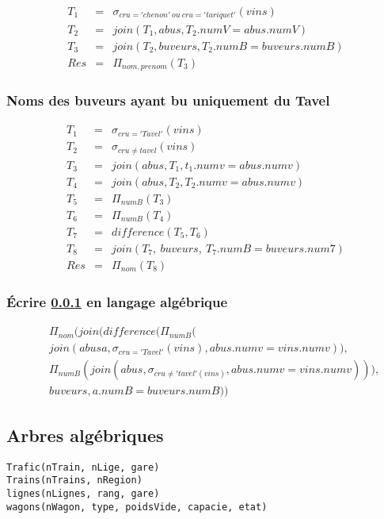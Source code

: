 \begin{eqnarray*}
	T_1 &=&  \sigma_{cru='chenon'\ ou\ cru='tariquet'}(vins)\\
	T_2&=&   join(T_1, abus, T_2.numV= abus.numV)\\
	T_3 &=& join(T_2, buveurs, T_2.numB=buveurs.numB)\\
	Res &=& \Pi_{nom, prenom}(T_3)
\end{eqnarray*}

\subsubsection{Noms des buveurs ayant bu uniquement du Tavel}\label{q4}
\begin{eqnarray*}
	T_1 &=& \sigma_{cru = 'Tavel'}(vins)\\
	T_2 &=& \sigma_{cru \neq tavel}(vins)\\
	T_3 &=& join(abus, T_1, t_1.numv=abus.numv)\\
	T_4 &=& join(abus, T_2, T_2.numv=abus.numv)\\
	T_5 &=& \Pi_{numB}(T_3)\\
	T_6 &=& \Pi_{numB}(T_4)\\
	T_7 &=& difference(T_5, T_6)\\
	T_8 &=& join(T_7,\ buveurs,\ T_7.numB = buveurs.num7)\\
	Res &=& \Pi_{nom}(T_8)
\end{eqnarray*}
\subsubsection{Écrire \ref{q4} en langage algébrique} 
\begin{eqnarray*}
	&&\Pi_{nom}(join(difference(\Pi_{numB}(\\
	&&join(abus a, \sigma_{cru='Tavel'}(vins), abus.numv=vins.numv)), \\
	&&\Pi_{numB}(join(abus, \sigma_{cru\neq 'tavel'(vins)}, abus.numv=vins.numv))),\\
	&& buveurs, a.numB=buveurs.numB))
\end{eqnarray*}
\subsection{Arbres algébriques}
\texttt{Trafic(nTrain, nLige, gare)} \\
\texttt{Trains(nTrains, nRegion)} \\	
\texttt{lignes(nLignes, rang, gare)} \\
\texttt{wagons(nWagon, type, poidsVide, capacie, etat)} \\
